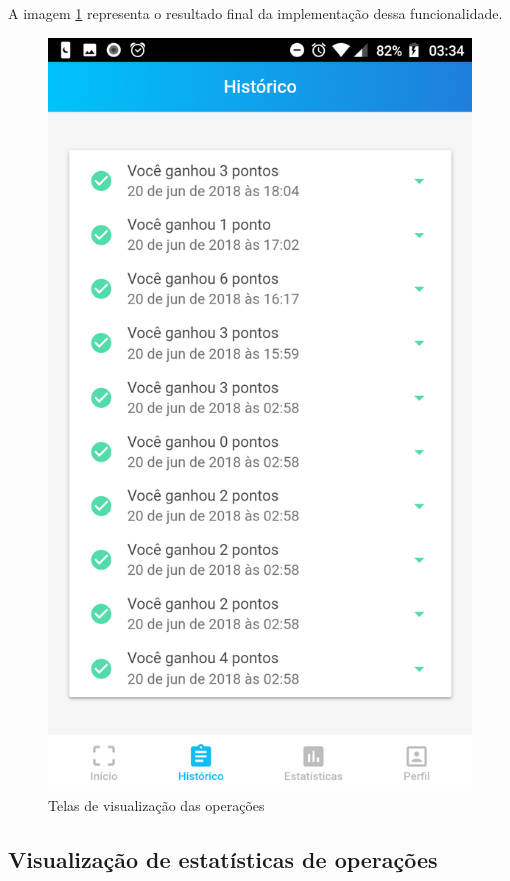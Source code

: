 A imagem \ref{fig:operation} representa o resultado final da implementação dessa funcionalidade.

\begin{figure}[!ht]
	\centering
		\includegraphics[scale=0.2]{figuras/software/pontuacao.png}
	\caption{Telas de visualização das operações}
	\label{fig:operation}
\end{figure}

\subsection{Visualização de estatísticas de operações}

